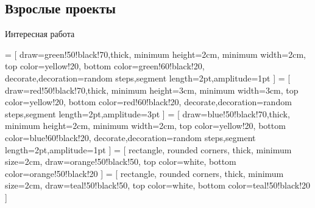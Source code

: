\subsection{Взрослые проекты}

\begin{frame}{Интересная работа}
    \begin{center}
         = [
            draw=green!50!black!70,thick,
            minimum height=2cm,
            minimum width=2cm,
            top color=yellow!20,
            bottom color=green!60!black!20,
            decorate,decoration={random steps,segment length=2pt,amplitude=1pt}
        ]
         = [
            draw=red!50!black!70,thick,
            minimum height=3cm,
            minimum width=3cm,
            top color=yellow!20,
            bottom color=red!60!black!20,
            decorate,decoration={random steps,segment length=2pt,amplitude=3pt}
        ]
         = [
            draw=blue!50!black!70,thick,
            minimum height=2cm,
            minimum width=2cm,
            top color=yellow!20,
            bottom color=blue!60!black!20,
            decorate,decoration={random steps,segment length=2pt,amplitude=1pt}
        ]
         = [
            rectangle, rounded corners,
            thick,
            minimum size=2cm,
            draw=orange!50!black!50,
            top color=white,
            bottom color=orange!50!black!20
        ]
         = [
            rectangle, rounded corners,
            thick,
            minimum size=2cm,
            draw=teal!50!black!50,
            top color=white,
            bottom color=teal!50!black!20
        ]
\end{center}
\end{frame}
